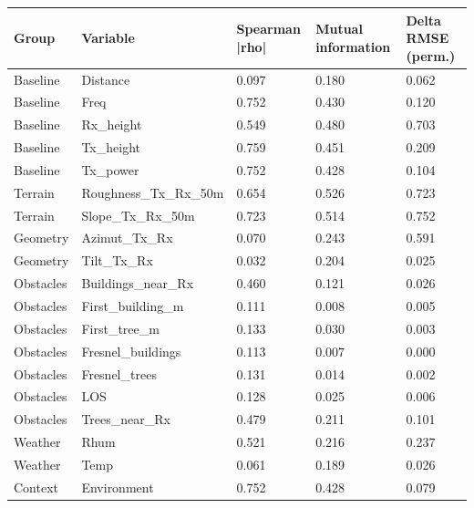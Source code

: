 \begin{tabular}{lllll}
\toprule
Group & Variable & Spearman |rho| & Mutual information & Delta RMSE (perm.) \\
\midrule
Baseline & Distance & 0.097 & 0.180 & 0.062 \\
Baseline & Freq & 0.752 & 0.430 & 0.120 \\
Baseline & Rx\_height & 0.549 & 0.480 & 0.703 \\
Baseline & Tx\_height & 0.759 & 0.451 & 0.209 \\
Baseline & Tx\_power & 0.752 & 0.428 & 0.104 \\
Terrain & Roughness\_Tx\_Rx\_50m & 0.654 & 0.526 & 0.723 \\
Terrain & Slope\_Tx\_Rx\_50m & 0.723 & 0.514 & 0.752 \\
Geometry & Azimut\_Tx\_Rx & 0.070 & 0.243 & 0.591 \\
Geometry & Tilt\_Tx\_Rx & 0.032 & 0.204 & 0.025 \\
Obstacles & Buildings\_near\_Rx & 0.460 & 0.121 & 0.026 \\
Obstacles & First\_building\_m & 0.111 & 0.008 & 0.005 \\
Obstacles & First\_tree\_m & 0.133 & 0.030 & 0.003 \\
Obstacles & Fresnel\_buildings & 0.113 & 0.007 & 0.000 \\
Obstacles & Fresnel\_trees & 0.131 & 0.014 & 0.002 \\
Obstacles & LOS & 0.128 & 0.025 & 0.006 \\
Obstacles & Trees\_near\_Rx & 0.479 & 0.211 & 0.101 \\
Weather & Rhum & 0.521 & 0.216 & 0.237 \\
Weather & Temp & 0.061 & 0.189 & 0.026 \\
Context & Environment & 0.752 & 0.428 & 0.079 \\
\bottomrule
\end{tabular}
